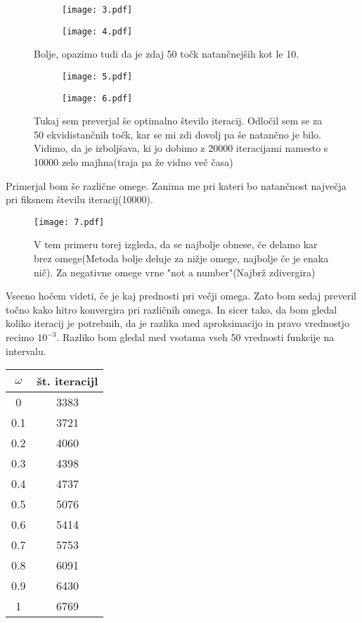 \documentclass{article}
\begin{document}
\begin{figure}[H]
\begin{subfigure}{.5\textwidth}
\texttt{[image: 3.pdf]}
\end{subfigure}
\begin{subfigure}{.5\textwidth}
\texttt{[image: 4.pdf]}
\end{subfigure}
\caption*{Bolje, opazimo tudi da je zdaj 50 točk natančnejših kot le 10.}
\end{figure}

\begin{figure}[H]
\begin{subfigure}{.5\textwidth}
\texttt{[image: 5.pdf]}
\end{subfigure}
\begin{subfigure}{.5\textwidth}
\texttt{[image: 6.pdf]}
\end{subfigure}
\caption*{Tukaj sem preverjal še optimalno število iteracij. Odločil sem se za 50 ekvidistančnih točk, kar se mi zdi dovolj pa še natančno je bilo. Vidimo, da je izboljšava, ki jo dobimo z 20000 iteracijami namesto s 10000 zelo majhna(traja pa že vidno več časa)}
\end{figure}
\newpage
Primerjal bom še različne omege. Zanima me pri kateri bo natančnost največja pri fiksnem številu iteracij(10000).

\begin{figure}[H]
\texttt{[image: 7.pdf]}
\caption*{V tem primeru torej izgleda, da se najbolje obnese, če delamo kar brez omege(Metoda bolje deluje za nižje omege, najbolje če je enaka nič). Za negativne omege vrne "not a number"(Najbrž zdivergira)}
\end{figure}

Vseeno hočem videti, če je kaj prednosti pri večji omega. Zato bom sedaj preveril točno kako hitro konvergira pri različnih omega.
In sicer tako, da bom gledal koliko iteracij je potrebnih, da je razlika med aproksimacijo in pravo vrednostjo recimo $10^{-3}$. Razliko bom gledal med vsotama vseh 50 vrednosti funkcije na intervalu.
\newpage
\begin{center}
 \begin{tabular}{||c c||} 
 \hline
 $\omega$ & št. iteracijl \\ [0.5ex] 
 \hline\hline
 0 & 3383 \\ 
 \hline
 0.1 & 3721 \\ 
 \hline
 0.2 & 4060 \\ 
 \hline
 0.3 & 4398 \\ 
 \hline
 0.4 & 4737 \\ 
 \hline
 0.5 & 5076 \\ 
 \hline
 0.6 & 5414 \\ 
 \hline
 0.7 & 5753 \\ 
 \hline
 0.8 & 6091 \\ 
 \hline
 0.9 & 6430 \\ 
 \hline
 1 & 6769 \\ 
 \hline
\end{tabular}
\end{center}
\end{document}
